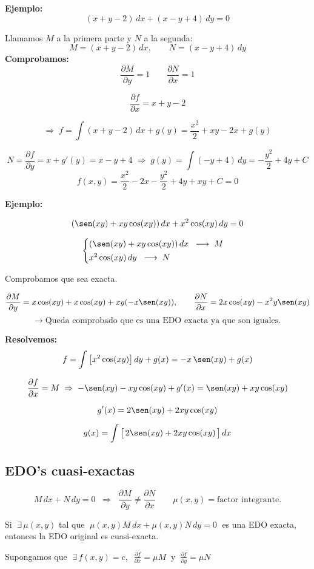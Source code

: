 \documentclass[a4paper,12pt]{article}
\begin{document}
\textbf{Ejemplo:}
\[
(x+y-2)\,dx + (x-y+4)\,dy = 0
\]

Llamamos \(M\) a la primera parte y \(N\) a la segunda:
\[
M=(x+y-2)\,dx, \qquad N=(x-y+4)\,dy
\]
\textbf{Comprobamos:}
\[
\frac{\partial M}{\partial y}=1  
\qquad 
\frac{\partial N}{\partial x}=1
\]

\[
\frac{\partial f}{\partial x}=x+y-2
\]

\[
\Rightarrow\;
f=\int (x+y-2)\,dx + g(y)
= \frac{x^{2}}{2}+xy-2x+g(y)
\]

\[
N=\frac{\partial f}{\partial y}=x+g'(y)=x-y+4
\;\Rightarrow\;
g(y)=\int(-y+4)\,dy=-\frac{y^{2}}{2}+4y+C
\]
\[
f(x,y)=\frac{x^{2}}{2}-2x-\frac{y^{2}}{2}+4y+xy+C=0
\]

\textbf{Ejemplo:}

\[
(\sen(xy)+xy\cos(xy))\,dx+x^{2}\cos(xy)\,dy=0
\]

\[
\begin{cases}
(\sen(xy)+xy\cos(xy))\,dx \;\;\longrightarrow\; M\\[2pt]
x^{2}\cos(xy)\,dy \;\;\longrightarrow\; N
\end{cases}
\]

Comprobamos que sea exacta.

\[
\frac{\partial M}{\partial y}
= x\cos(xy) + x\cos(xy) + xy(-x\sen(xy)),
\qquad
\frac{\partial N}{\partial x}
= 2x\cos(xy) - x^{2}y\sen(xy)
\]
\[
\longrightarrow\; \text{Queda comprobado que es una EDO exacta ya que son iguales.}
\]

\textbf{Resolvemos:}
\[
f=\int \big[x^{2}\cos(xy)\big]\,dy + g(x) = -x\,\sen(xy) + g(x)
\]

\[
\frac{\partial f}{\partial x}=M
\;\Rightarrow\;
-\sen(xy)-xy\cos(xy)+g'(x) = \sen(xy)+xy\cos(xy)
\]

\[
g'(x)=2\sen(xy)+2xy\cos(xy)
\]

\[
g(x)=\int \big[\,2\sen(xy)+2xy\cos(xy)\,\big]\,dx
\]
\subsection{EDO's cuasi-exactas}

\[
M\,dx + N\,dy = 0 \;\;\Rightarrow\;\; \frac{\partial M}{\partial y} \neq \frac{\partial N}{\partial x}
\qquad
\mu(x,y)=\text{factor integrante.}
\]

Si $\;\exists\,\mu(x,y)$ tal que $\;\mu(x,y)M\,dx+\mu(x,y)N\,dy=0\;$ es una EDO exacta, entonces la EDO original es cuasi-exacta.

\medskip
Supongamos que $\;\exists\,f(x,y)=c,\;\; \frac{\partial f}{\partial x}=\mu M\;\; \text{y}\;\; \frac{\partial f}{\partial y}=\mu N$
\end{document}

